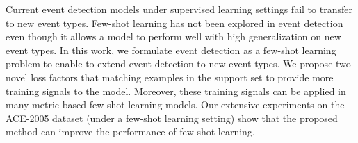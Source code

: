 Current event detection models under supervised learning settings fail to transfer to new event types. Few-shot learning has not been explored in event detection even though it allows a model to perform well with high generalization on new event types. In this work, we formulate event detection as a few-shot learning problem to enable to extend event detection to new event types. We propose two novel loss factors that matching examples in the support set to provide more training signals to the model. Moreover, these training signals can be applied in many metric-based few-shot learning models. Our extensive experiments on the ACE-2005 dataset (under a few-shot learning setting) show that the proposed method can improve the performance of few-shot learning.
